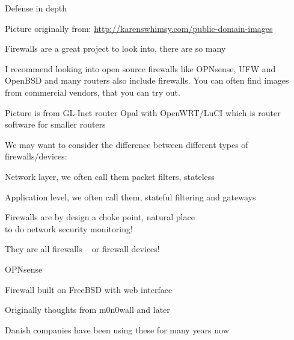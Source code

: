 \documentclass[Screen16to9,17pt]{foils}
\begin{document}


Defense in depth

\centerline{Picture originally from: \url{http://karenswhimsy.com/public-domain-images}}




\begin{list2}
\item Firewalls are a great project to look into, there are so many \smiley
\item I recommend looking into open source firewalls like OPNsense, UFW and OpenBSD and many routers also include firewalls. You can often find images from commercial vendors, that you can try out.
\item Picture is from GL-Inet router Opal with OpenWRT/LuCI which is router software for smaller routers
\end{list2}



We may want to consider the difference between different types of firewalls/devices:
\begin{list2}
\item Network layer, we often call them packet filters, stateless
\item Application level, we often call them, stateful filtering and gateways
\item Firewalls are by design a choke point, natural place \\
to do network security monitoring!
\end{list2}

They are all firewalls -- or firewall devices!





\begin{list2}
\item OPNsense 
\item Firewall built on FreeBSD with web interface
\item Originally thoughts from m0n0wall and later \\
\item Danish companies have been using these for many years now
\end{list2}
\end{document}
